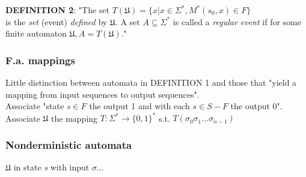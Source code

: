 \textbf{DEFINITION 2}: 
"The set $T(\mathfrak{U}) = \{ x | x \in \Sigma^{*}, M^{*}(s_0, x) \in F \}$ \\
is the \textit{set} (event) \textit{defined} by $\mathfrak{U}$. A set $A \subseteq \Sigma^{*}$ is called a \textit{regular event} if for some finite automaton $\mathfrak{U}, A = T(\mathfrak{U})$."

\subsubsection{F.a. mappings}
Little distinction between automata in DEFINITION 1 and those that "yield a mapping from input sequences to output sequences".\\
Associate "state $s \in F$ the output 1 and with each $s \in S - F$ the output 0".\\
Associate $\mathfrak{U}$ the mapping $T:\Sigma^{*} \to \{ 0, 1 \}^{*}$ s.t. $T(\sigma_{0} \sigma_{1}...\sigma_{n-1})$
 
\subsubsection{Nonderministic automata}
$\mathfrak{U}$ in state \textit{s} with input $\sigma$...

